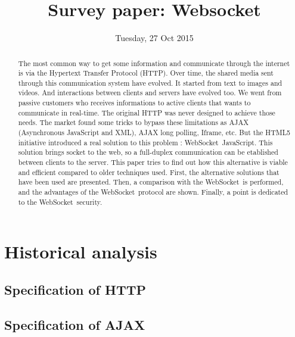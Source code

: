 \documentclass[journal,compsoc]{IEEEtran}
\newcommand{\ws}{WebSocket~}
\begin{document}
\author{}

\title{Survey paper: Websocket}

\date{Tuesday, 27 Oct 2015}

\maketitle
\IEEEpeerreviewmaketitle



\begin{abstract}
The most common way to get some information and communicate through the internet is via the Hypertext Transfer Protocol (HTTP).
Over time, the shared media sent through this communication system have evolved.
It started from text to images and videos.
And interactions between clients and servers have evolved too.
We went from passive customers who receives informations to active clients that wants to communicate in real-time.
The original HTTP was never designed to achieve those needs.
The market found some tricks to bypass these limitations as AJAX (Asynchronous JavaScript and XML), AJAX long polling, Iframe, etc.
But the HTML5 initiative introduced a real solution to this problem : \ws JavaScript.
This solution brings socket to the web, so a full-duplex communication can be etablished between clients to the server.
This paper tries to find out how this alternative is viable and efficient compared to older techniques used. \cite{http-rfc}
First, the alternative solutions that have been used are presented.
Then, a comparison with the \ws is performed, and the advantages of the \ws protocol are shown.
Finally, a point is dedicated to the \ws security.
\end{abstract}


\section{Historical analysis}




\subsection{Specification of HTTP}

\subsection{Specification of AJAX}
\end{document}
